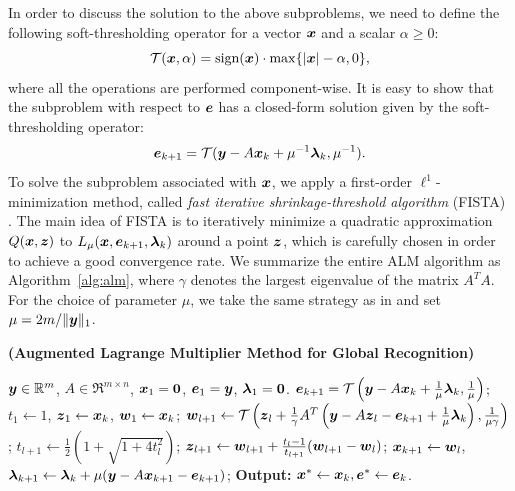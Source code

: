 \documentclass[10pt,journal,letterpaper,compsoc]{IEEEtran} %
\begin{document}
In order to discuss the solution to the above subproblems, we
need to define the following soft-thresholding operator for a
vector ${\boldsymbol{x}}$ and a scalar $\alpha \geq 0$:
\begin{equation}
\mathcal{T}({\boldsymbol{x}},\alpha) = \textup{sign}({\boldsymbol{x}})\cdot \max \{|{\boldsymbol{x}}| - \alpha, 0\},
\end{equation}
where all the operations are performed component-wise. It is
easy to show that the subproblem with respect to $\boldsymbol{e}$ has a
closed-form solution given by the soft-thresholding operator:
\begin{equation}
\boldsymbol{e}_{k+1} = \mathcal{T}({\boldsymbol{y}} - A{\boldsymbol{x}}_k + \mu^{-1}\boldsymbol{\lambda}_k, \mu^{-1}).
\end{equation}
To solve the subproblem associated with ${\boldsymbol{x}}$, we
apply a first-order $\ell^1$-minimization method,
called \emph{fast iterative shrinkage-threshold algorithm}
(FISTA) \cite{BeckA2009}. The main idea of FISTA is to
iteratively minimize a quadratic approximation $Q({\boldsymbol{x}}, \boldsymbol{z})$ to
$L_{\mu} ({\boldsymbol{x}},\boldsymbol{e}_{k+1},\boldsymbol{\lambda}_k)$ around a point $\boldsymbol{z}$, which is
carefully chosen in order to achieve a good convergence
rate. We summarize the entire ALM
algorithm as Algorithm~\ref{alg:alm}, where $\gamma$ denotes the
largest eigenvalue of the matrix $A^TA$. For the choice of parameter $\mu$, we take the same strategy as
in \cite{YangJ2009-pp} and set $\mu = 2m / \|{\boldsymbol{y}}\|_1$.
\begin{algorithm}[t]
\caption{\bf (Augmented Lagrange Multiplier Method for Global
Recognition)}
\begin{algorithmic}[1]
\begin{small}
 ${\boldsymbol{y}} \in \mathbb R^m$, $A \in \Re^{m \times n}$,
${\boldsymbol{x}}_1 = \boldsymbol{0}$, $\boldsymbol{e}_1 = {\boldsymbol{y}}$, $\boldsymbol{\lambda}_1 =
\boldsymbol{0}$.
\STATE $\boldsymbol{e}_{k+1} = \mathcal{T}\left({\boldsymbol{y}} - A{\boldsymbol{x}}_k +
\frac{1}{\mu}\boldsymbol{\lambda}_k, \frac{1}{\mu}\right)$;
\STATE $t_1\leftarrow 1$, $\boldsymbol{z}_1 \leftarrow {\boldsymbol{x}}_k$, $\boldsymbol{w}_1 \leftarrow {\boldsymbol{x}}_k$;
\STATE $\boldsymbol{w}_{l+1} \leftarrow \mathcal{T}\left(\boldsymbol{z}_l +
\frac{1}{\gamma}A^T\left({\boldsymbol{y}} - A\boldsymbol{z}_l - \boldsymbol{e}_{k+1} +
\frac{1}{\mu}\boldsymbol{\lambda}_k\right), \frac{1}{\mu\gamma}\right)$;
\STATE $t_{l+1} \leftarrow \frac{1}{2}\left( 1 +
\sqrt{1+4t_l^2}\right)$;
\STATE $\boldsymbol{z}_{l+1} \leftarrow \boldsymbol{w}_{l+1} + \frac{t_l - 1}{t_{l+1}}(\boldsymbol{w}_{l+1} - \boldsymbol{w}_l)$;
\ENDWHILE
\STATE ${\boldsymbol{x}}_{k+1} \leftarrow \boldsymbol{w}_{l}$,  \; $\boldsymbol{\lambda}_{k+1} \leftarrow \boldsymbol{\lambda}_k + \mu ({\boldsymbol{y}} - A{\boldsymbol{x}}_{k+1} - \boldsymbol{e}_{k+1})$;
\ENDWHILE \STATE
{\bf Output:} ${\boldsymbol{x}}^* \leftarrow {\boldsymbol{x}}_k, \boldsymbol{e}^* \leftarrow \boldsymbol{e}_k$.
\end{small}
\end{algorithmic}
\label{alg:alm}
\end{algorithm}
\end{document}
